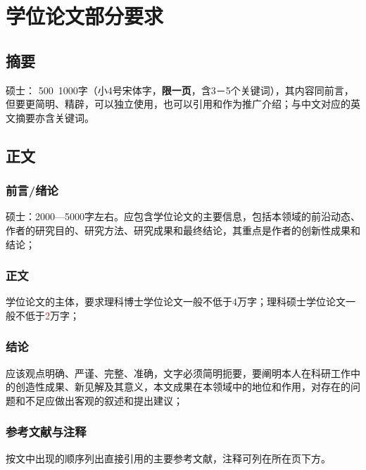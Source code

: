 \documentclass{nuistthesis}
\begin{document}

\abstract {
}{
}


\mainmatterstart

\chapter{学位论文部分要求}

\section{摘要}

硕士： 500~1000字（小4号宋体字，{\bfseries 限一页}，含3－5个关键词），其内容同前言，但要更简明、精辟，可以独立使用，也可以引用和作为推广介绍；与中文对应的英文摘要亦含关键词。

\section{正文}

\subsection{前言/绪论}

硕士：2000—5000字左右。应包含学位论文的主要信息，包括本领域的前沿动态、作者的研究目的、研究方法、研究成果和最终结论，其重点是作者的创新性成果和结论；

\subsection{正文}

学位论文的主体，要求理科博士学位论文一般不低于4万字；理科硕士学位论文一般不低于\textcolor{red}{2}万字；

\subsection{结论}

应该观点明确、严谨、完整、准确，文字必须简明扼要，要阐明本人在科研工作中的创造性成果、新见解及其意义，本文成果在本领域中的地位和作用，对存在的问题和不足应做出客观的叙述和提出建议；

\subsection{参考文献与注释}

按文中出现的顺序列出直接引用的主要参考文献，注释可列在所在页下方。
\end{document}

